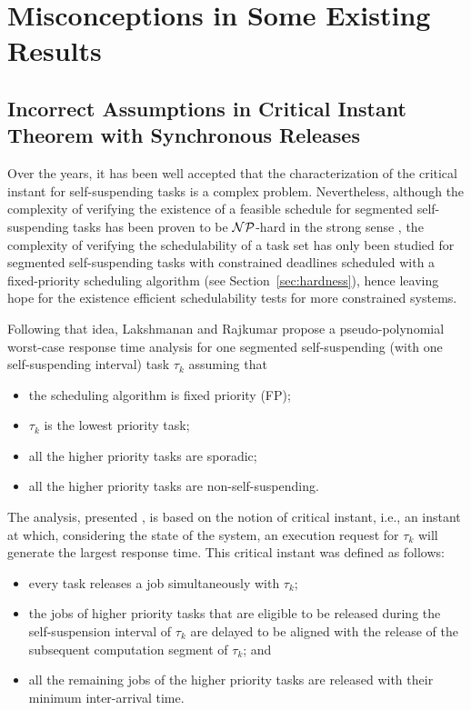 
\section{Misconceptions in Some Existing Results}
\subsection{Incorrect Assumptions in Critical Instant Theorem with Synchronous Releases}
\label{sec:wrong-critical}

Over the years, it has been well accepted that the characterization of the critical instant for self-suspending tasks is a complex problem. Nevertheless, although the complexity of verifying the existence of a feasible schedule for segmented self-suspending tasks has been proven to be ${\cal NP}$-hard in the strong sense \cite{Ridouard_2004}, the complexity of verifying the schedulability of a task set has only been studied for segmented self-suspending tasks with constrained deadlines scheduled with a fixed-priority scheduling algorithm (see Section~\ref{sec:hardness}), hence leaving hope for the existence efficient schedulability tests for more constrained systems. 

Following that idea, Lakshmanan and Rajkumar \cite{RTAS-LakshmananR10} propose a pseudo-polynomial worst-case response time analysis for one segmented self-suspending (with one self-suspending interval) task $\tau_k$ assuming that 
\begin{itemize}
\item the scheduling algorithm is fixed priority (FP);
\item $\tau_k$ is the lowest priority task; 
\item all the higher priority tasks are sporadic;
\item all the higher priority tasks are non-self-suspending.
\end{itemize}
The analysis, presented \cite{RTAS-LakshmananR10}, is based on the notion of critical instant, i.e., an instant at which, considering the state of the system, an execution request for $\tau_k$ will generate the largest response time. This critical instant was defined as follows:
\begin{itemize}
	\item every task releases a job simultaneously with $\tau_k$;
	\item the jobs of higher priority tasks that are eligible to be released during the self-suspension interval of $\tau_k$ are delayed to be aligned with the release of the subsequent computation segment of $\tau_k$; and
	\item all the remaining jobs of the higher priority tasks are released with their minimum inter-arrival time.
\end{itemize}

